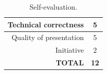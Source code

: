 \documentclass[12pt,a4paper]{article}
\begin{document}
\begin{table}[!htb]
	\centering
	\caption{Self-evaluation.}
	\begin{tabular}{|r|c|}
		\hline
		Technical correctness & 5 \\ \hline
		Quality of presentation & 5 \\ \hline
		Initiative & 2 \\ \hline
		\textbf{TOTAL} & \textbf{12} \\ \hline
	\end{tabular}
	\label{tab:self-eval}
\end{table}



\end{document}
